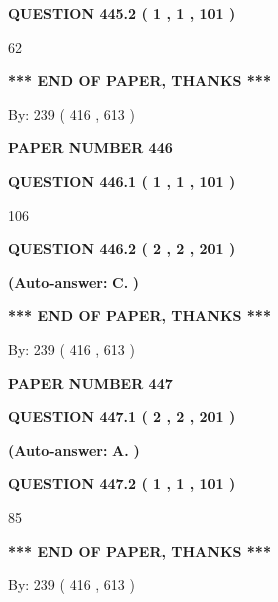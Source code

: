\documentclass[12pt]{article}
\begin{document}
  
{\textbf{\large{QUESTION
445.2 
 ( 1 , 1 , 101 )
}}}

62
   
   
   
   
\vspace{1.0in} 
{\textbf{\large{ *** END OF PAPER, THANKS *** }}} 
   
   
\hspace{1.0in} By: 
 239 ( 416 ,  613 )
   
   
   
   
\newpage 
\setcounter{page}{ 
   446001 } 
   
   
 {\textbf{ \Large{ PAPER NUMBER  446  }}}
   
   
   
   
  
  
{\textbf{\large{QUESTION
446.1 
 ( 1 , 1 , 101 )
}}}

106
  
  
{\textbf{\large{QUESTION
446.2 
 ( 2 , 2 , 201 )
}}}
 
 
{\textbf{(Auto-answer:}}
{\textbf{\large{
C.}}}
{\textbf{)}}
 
 
   
   
   
   
\vspace{1.0in} 
{\textbf{\large{ *** END OF PAPER, THANKS *** }}} 
   
   
\hspace{1.0in} By: 
 239 ( 416 ,  613 )
   
   
   
   
\newpage 
\setcounter{page}{ 
   447001 } 
   
   
 {\textbf{ \Large{ PAPER NUMBER  447  }}}
   
   
   
   
  
  
{\textbf{\large{QUESTION
447.1 
 ( 2 , 2 , 201 )
}}}
 
 
{\textbf{(Auto-answer:}}
{\textbf{\large{
A.}}}
{\textbf{)}}
 
 
  
  
{\textbf{\large{QUESTION
447.2 
 ( 1 , 1 , 101 )
}}}

85
   
   
   
   
\vspace{1.0in} 
{\textbf{\large{ *** END OF PAPER, THANKS *** }}} 
   
   
\hspace{1.0in} By: 
 239 ( 416 ,  613 )
   
   
   
\end{document}
